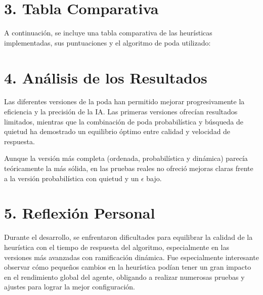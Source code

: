 \section*{3. Tabla Comparativa}
A continuación, se incluye una tabla comparativa de las heurísticas implementadas, sus puntuaciones y el algoritmo de poda utilizado:

\begin{table}[H]
    \centering
    \renewcommand{\arraystretch}{1.2}
    \caption{Comparativa de heurísticas implementadas.}
    \label{tab:heuristicas_comparativa}
\end{table}

\section*{4. Análisis de los Resultados}
Las diferentes versiones de la poda han permitido mejorar progresivamente la eficiencia y la precisión de la IA. Las primeras versiones ofrecían resultados limitados, mientras que la combinación de poda probabilística y búsqueda de quietud ha demostrado un equilibrio óptimo entre calidad y velocidad de respuesta.

Aunque la versión más completa (ordenada, probabilística y dinámica) parecía teóricamente la más sólida, en las pruebas reales no ofreció mejoras claras frente a la versión probabilística con quietud y un $\epsilon$ bajo.

\section*{5. Reflexión Personal}
Durante el desarrollo, se enfrentaron dificultades para equilibrar la calidad de la heurística con el tiempo de respuesta del algoritmo, especialmente en las versiones más avanzadas con ramificación dinámica. Fue especialmente interesante observar cómo pequeños cambios en la heurística podían tener un gran impacto en el rendimiento global del agente, obligando a realizar numerosas pruebas y ajustes para lograr la mejor configuración.

